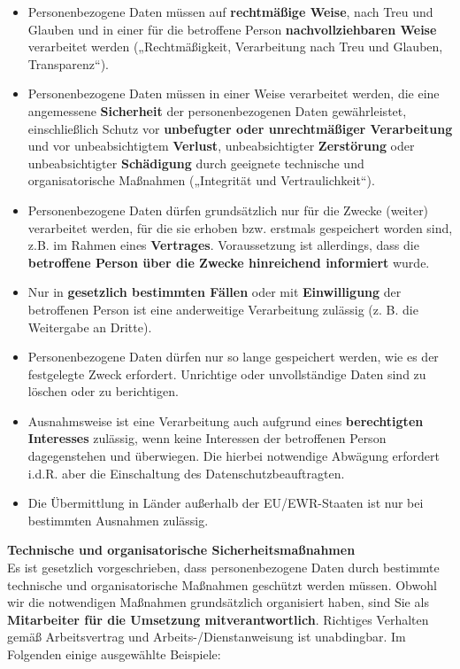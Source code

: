 \documentclass[../Vorlagen/de-RSE_Kopf,a4paper]{scrlttr2}
\begin{document}
\begin{itemize}
    \item Personenbezogene Daten müssen auf \textbf{rechtmäßige Weise}, nach Treu und Glauben und in einer für die betroffene Person \textbf{nachvollziehbaren Weise} verarbeitet werden („Rechtmäßigkeit, Verarbeitung nach Treu und Glauben, Transparenz“).
    \item Personenbezogene Daten müssen in einer Weise verarbeitet werden, die eine angemessene \textbf{Sicherheit} der personenbezogenen Daten gewährleistet, einschließlich Schutz vor \textbf{unbefugter oder unrechtmäßiger Verarbeitung} und vor unbeabsichtigtem \textbf{Verlust}, unbeabsichtigter \textbf{Zerstörung} oder unbeabsichtigter \textbf{Schädigung} durch geeignete technische und organisatorische Maßnahmen („Integrität und Vertraulichkeit“).
    \item Personenbezogene Daten dürfen grundsätzlich nur für die Zwecke (weiter) verarbeitet werden, für die sie erhoben bzw. erstmals gespeichert worden sind, z.B. im Rahmen eines \textbf{Vertrages}. Voraussetzung ist allerdings, dass die \textbf{betroffene Person über die Zwecke hinreichend informiert} wurde.
    \item Nur in \textbf{gesetzlich bestimmten Fällen} oder mit \textbf{Einwilligung} der betroffenen Person ist eine anderweitige Verarbeitung zulässig (z. B. die Weitergabe an Dritte).
    \item Personenbezogene Daten dürfen nur so lange gespeichert werden, wie es der festgelegte Zweck erfordert. Unrichtige oder unvollständige Daten sind zu löschen oder zu berichtigen. 
    \item  Ausnahmsweise ist eine Verarbeitung auch aufgrund eines \textbf{berechtigten Interesses} zulässig, wenn keine Interessen der betroffenen Person dagegenstehen und überwiegen. Die hierbei notwendige Abwägung erfordert i.d.R. aber die Einschaltung des Datenschutzbeauftragten.
    \item Die Übermittlung in Länder außerhalb der EU/EWR-Staaten ist nur bei bestimmten Ausnahmen zulässig.
\end{itemize}

\textbf{Technische und organisatorische Sicherheitsmaßnahmen} \\
Es ist gesetzlich vorgeschrieben, dass personenbezogene Daten durch bestimmte technische und organisatorische Maßnahmen geschützt werden müssen. Obwohl wir die notwendigen Maßnahmen grundsätzlich organisiert haben, sind Sie als \textbf{Mitarbeiter für die Umsetzung mitverantwortlich}. Richtiges Verhalten gemäß Arbeitsvertrag und Arbeits-/Dienstanweisung ist unabdingbar. Im Folgenden einige ausgewählte Beispiele: \\
\end{document}
